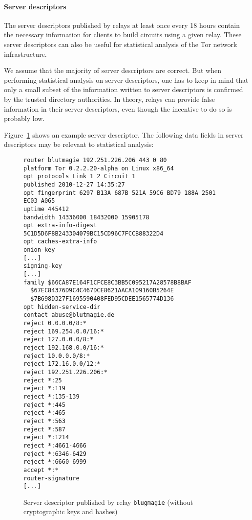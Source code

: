 \documentclass{article}
\begin{document}
\paragraph{Server descriptors}

The server descriptors published by relays at least once every 18 hours
contain the necessary information for clients to build circuits using a
given relay.
These server descriptors can also be useful for statistical analysis of
the Tor network infrastructure.

We assume that the majority of server descriptors are correct.
But when performing statistical analysis on server descriptors, one has to
keep in mind that only a small subset of the information written to server
descriptors is confirmed by the trusted directory authorities.
In theory, relays can provide false information in their server
descriptors, even though the incentive to do so is probably low.

Figure~\ref{fig:serverdesc} shows an example server descriptor.
The following data fields in server descriptors may be relevant to
statistical analysis:

\begin{figure}
\begin{verbatim}
router blutmagie 192.251.226.206 443 0 80
platform Tor 0.2.2.20-alpha on Linux x86_64
opt protocols Link 1 2 Circuit 1
published 2010-12-27 14:35:27
opt fingerprint 6297 B13A 687B 521A 59C6 BD79 188A 2501 EC03 A065
uptime 445412
bandwidth 14336000 18432000 15905178
opt extra-info-digest 5C1D5D6F8B243304079BC15CD96C7FCCB88322D4
opt caches-extra-info
onion-key
[...]
signing-key
[...]
family $66CA87E164F1CFCE8C3BB5C095217A28578B8BAF
  $67EC84376D9C4C467DCE8621AACA109160B5264E
  $7B698D327F1695590408FED95CDEE1565774D136
opt hidden-service-dir
contact abuse@blutmagie.de
reject 0.0.0.0/8:*
reject 169.254.0.0/16:*
reject 127.0.0.0/8:*
reject 192.168.0.0/16:*
reject 10.0.0.0/8:*
reject 172.16.0.0/12:*
reject 192.251.226.206:*
reject *:25
reject *:119
reject *:135-139
reject *:445
reject *:465
reject *:563
reject *:587
reject *:1214
reject *:4661-4666
reject *:6346-6429
reject *:6660-6999
accept *:*
router-signature
[...]
\end{verbatim}
\vspace{-1em}
\caption{Server descriptor published by relay \texttt{blugmagie} (without
cryptographic keys and hashes)}
\label{fig:serverdesc}
\end{figure}
\end{document}
